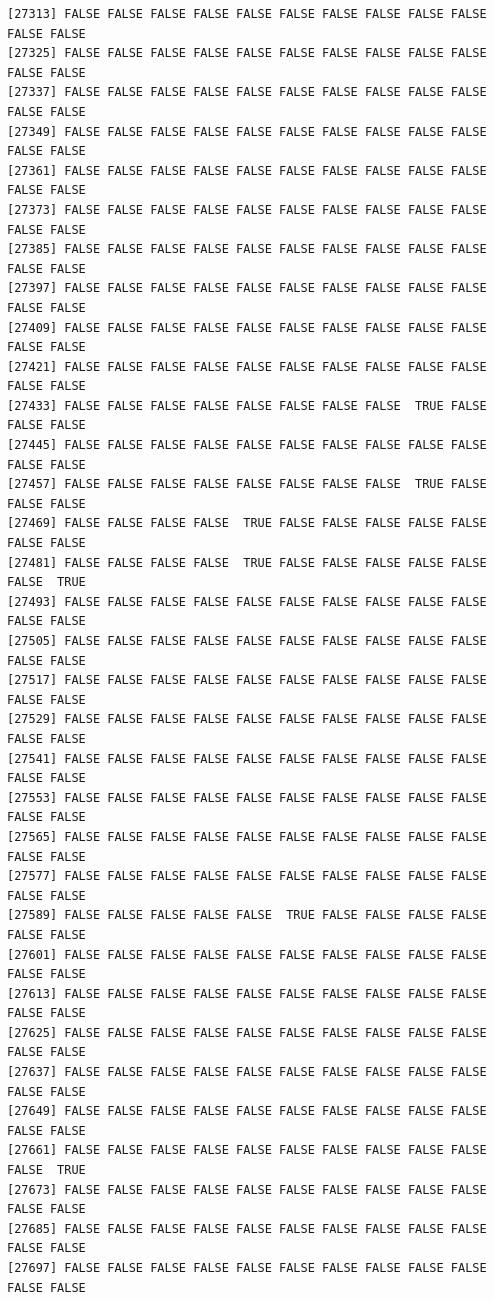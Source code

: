 \documentclass[
  a4paper,
  DIV=11,
  numbers=noendperiod]{scrartcl}
\begin{document}
\begin{verbatim}
[27313] FALSE FALSE FALSE FALSE FALSE FALSE FALSE FALSE FALSE FALSE FALSE FALSE
[27325] FALSE FALSE FALSE FALSE FALSE FALSE FALSE FALSE FALSE FALSE FALSE FALSE
[27337] FALSE FALSE FALSE FALSE FALSE FALSE FALSE FALSE FALSE FALSE FALSE FALSE
[27349] FALSE FALSE FALSE FALSE FALSE FALSE FALSE FALSE FALSE FALSE FALSE FALSE
[27361] FALSE FALSE FALSE FALSE FALSE FALSE FALSE FALSE FALSE FALSE FALSE FALSE
[27373] FALSE FALSE FALSE FALSE FALSE FALSE FALSE FALSE FALSE FALSE FALSE FALSE
[27385] FALSE FALSE FALSE FALSE FALSE FALSE FALSE FALSE FALSE FALSE FALSE FALSE
[27397] FALSE FALSE FALSE FALSE FALSE FALSE FALSE FALSE FALSE FALSE FALSE FALSE
[27409] FALSE FALSE FALSE FALSE FALSE FALSE FALSE FALSE FALSE FALSE FALSE FALSE
[27421] FALSE FALSE FALSE FALSE FALSE FALSE FALSE FALSE FALSE FALSE FALSE FALSE
[27433] FALSE FALSE FALSE FALSE FALSE FALSE FALSE FALSE  TRUE FALSE FALSE FALSE
[27445] FALSE FALSE FALSE FALSE FALSE FALSE FALSE FALSE FALSE FALSE FALSE FALSE
[27457] FALSE FALSE FALSE FALSE FALSE FALSE FALSE FALSE  TRUE FALSE FALSE FALSE
[27469] FALSE FALSE FALSE FALSE  TRUE FALSE FALSE FALSE FALSE FALSE FALSE FALSE
[27481] FALSE FALSE FALSE FALSE  TRUE FALSE FALSE FALSE FALSE FALSE FALSE  TRUE
[27493] FALSE FALSE FALSE FALSE FALSE FALSE FALSE FALSE FALSE FALSE FALSE FALSE
[27505] FALSE FALSE FALSE FALSE FALSE FALSE FALSE FALSE FALSE FALSE FALSE FALSE
[27517] FALSE FALSE FALSE FALSE FALSE FALSE FALSE FALSE FALSE FALSE FALSE FALSE
[27529] FALSE FALSE FALSE FALSE FALSE FALSE FALSE FALSE FALSE FALSE FALSE FALSE
[27541] FALSE FALSE FALSE FALSE FALSE FALSE FALSE FALSE FALSE FALSE FALSE FALSE
[27553] FALSE FALSE FALSE FALSE FALSE FALSE FALSE FALSE FALSE FALSE FALSE FALSE
[27565] FALSE FALSE FALSE FALSE FALSE FALSE FALSE FALSE FALSE FALSE FALSE FALSE
[27577] FALSE FALSE FALSE FALSE FALSE FALSE FALSE FALSE FALSE FALSE FALSE FALSE
[27589] FALSE FALSE FALSE FALSE FALSE  TRUE FALSE FALSE FALSE FALSE FALSE FALSE
[27601] FALSE FALSE FALSE FALSE FALSE FALSE FALSE FALSE FALSE FALSE FALSE FALSE
[27613] FALSE FALSE FALSE FALSE FALSE FALSE FALSE FALSE FALSE FALSE FALSE FALSE
[27625] FALSE FALSE FALSE FALSE FALSE FALSE FALSE FALSE FALSE FALSE FALSE FALSE
[27637] FALSE FALSE FALSE FALSE FALSE FALSE FALSE FALSE FALSE FALSE FALSE FALSE
[27649] FALSE FALSE FALSE FALSE FALSE FALSE FALSE FALSE FALSE FALSE FALSE FALSE
[27661] FALSE FALSE FALSE FALSE FALSE FALSE FALSE FALSE FALSE FALSE FALSE  TRUE
[27673] FALSE FALSE FALSE FALSE FALSE FALSE FALSE FALSE FALSE FALSE FALSE FALSE
[27685] FALSE FALSE FALSE FALSE FALSE FALSE FALSE FALSE FALSE FALSE FALSE FALSE
[27697] FALSE FALSE FALSE FALSE FALSE FALSE FALSE FALSE FALSE FALSE FALSE FALSE

\end{verbatim}
\end{document}
